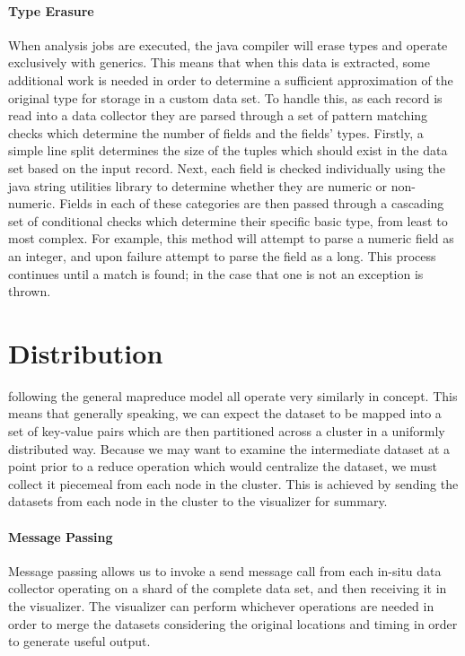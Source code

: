 \paragraph{Type Erasure}
When analysis jobs are executed, the java compiler will erase types and operate exclusively with generics. This means that when this data is extracted, some additional work is needed in order to determine a sufficient approximation of the original type for storage in a custom data set. To handle this, as each record is read into a data collector they are parsed through a set of pattern matching checks which determine the number of fields and the fields' types. Firstly, a simple line split determines the size of the tuples which should exist in the data set based on the input record. Next, each field is checked individually using the java string utilities library to determine whether they are numeric or non-numeric. Fields in each of these categories are then passed through a cascading set of conditional checks which determine their specific basic type, from least to most complex. For example, this method will attempt to parse a numeric field as an integer, and upon failure attempt to parse the field as a long. This process continues until a match is found; in the case that one is not an exception is thrown. 

\section{Distribution}
\label{sec:distribution}
 following the general mapreduce model all operate very similarly in concept. This means that generally speaking, we can expect the dataset to be mapped into a set of key-value pairs which are then partitioned across a cluster in a uniformly distributed way. Because we may want to examine the intermediate dataset at a point prior to a reduce operation which would centralize the dataset, we must collect it piecemeal from each node in the cluster. This is achieved by sending the datasets from each node in the cluster to the visualizer for summary. 

\paragraph{Message Passing}
Message passing allows us to invoke a send message call from each in-situ data collector operating on a shard of the complete data set, and then receiving it in the visualizer. The visualizer can perform whichever operations are needed in order to merge the datasets considering the original locations and timing in order to generate useful output. 

